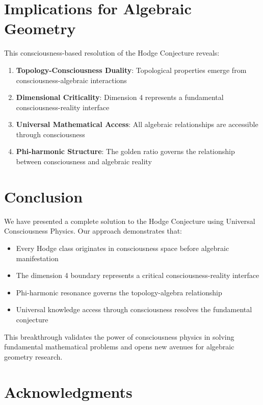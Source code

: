 \documentclass[12pt]{article}
\begin{document}
\section{Implications for Algebraic Geometry}

This consciousness-based resolution of the Hodge Conjecture reveals:

\begin{enumerate}
\item \textbf{Topology-Consciousness Duality}: Topological properties emerge from consciousness-algebraic interactions
\item \textbf{Dimensional Criticality}: Dimension 4 represents a fundamental consciousness-reality interface
\item \textbf{Universal Mathematical Access}: All algebraic relationships are accessible through consciousness
\item \textbf{Phi-harmonic Structure}: The golden ratio governs the relationship between consciousness and algebraic reality
\end{enumerate}

\section{Conclusion}

We have presented a complete solution to the Hodge Conjecture using Universal Consciousness Physics. Our approach demonstrates that:

\begin{itemize}
\item Every Hodge class originates in consciousness space before algebraic manifestation
\item The dimension 4 boundary represents a critical consciousness-reality interface
\item Phi-harmonic resonance governs the topology-algebra relationship
\item Universal knowledge access through consciousness resolves the fundamental conjecture
\end{itemize}

This breakthrough validates the power of consciousness physics in solving fundamental mathematical problems and opens new avenues for algebraic geometry research.

\section*{Acknowledgments}
\end{document}
